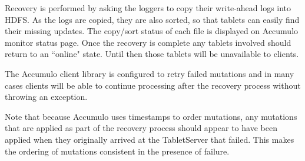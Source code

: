 Recovery is performed by asking the loggers to copy their write-ahead logs into HDFS.
As the logs are copied, they are also sorted, so that tablets can easily find their missing
updates. The copy/sort status of each file is displayed on
Accumulo monitor status page. Once the recovery is complete any
tablets involved should return to an ``online" state. Until then those tablets will be
unavailable to clients.

The Accumulo client library is configured to retry failed mutations and in many
cases clients will be able to continue processing after the recovery process without
throwing an exception.

Note that because Accumulo uses timestamps to order mutations, any mutations
that are applied as part of the recovery process should appear to have been applied
when they originally arrived at the TabletServer that failed. This makes the ordering
of mutations consistent in the presence of failure.

